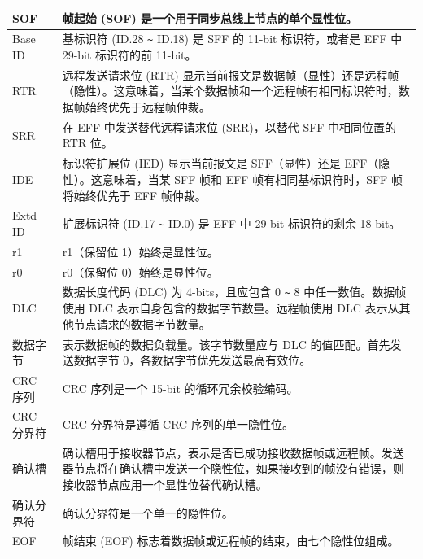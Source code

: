 \begin{longtable}[c]{|p{3.5cm}|p{12cm}|}
    SOF & 帧起始 (SOF) 是一个用于同步总线上节点的单个显性位。
          \\\hline
    Base ID & 基标识符 (ID.28 \verb+~+ ID.18) 是 SFF 的 11-bit 标识符，或者是 EFF 中 29-bit 标识符的前 11-bit。
          \\\hline
    RTR & 远程发送请求位 (RTR) 显示当前报文是数据帧（显性）还是远程帧（隐性）。这意味着，当某个数据帧和一个远程帧有相同标识符时，数据帧始终优先于远程帧仲裁。                                                    \\\hline
    SRR & 在 EFF 中发送替代远程请求位 (SRR)，以替代 SFF 中相同位置的 RTR 位。                       
           \\\hline
    IDE & 标识符扩展位 (IED) 显示当前报文是 SFF（显性）还是 EFF（隐性）。这意味着，当某 SFF 帧和 EFF 帧有相同基标识符时，SFF 帧将始终优先于 EFF 帧仲裁。              \\\hline
    Extd ID & 扩展标识符 (ID.17 \verb+~+ ID.0) 是 EFF 中 29-bit 标识符的剩余 18-bit。                                     \\\hline
    r1 & r1（保留位 1）始终是显性位。
             \\\hline 
    r0 & r0（保留位 0）始终是显性位。
             \\\hline
    DLC & 数据长度代码 (DLC) 为 4-bits，且应包含 0 \verb+~+ 8 中任一数值。数据帧使用 DLC 表示自身包含的数据字节数量。远程帧使用 DLC 表示从其他节点请求的数据字节数量。 
             \\\hline
    数据字节 & 表示数据帧的数据负载量。该字节数量应与 DLC 的值匹配。首先发送数据字节 0，各数据字节优先发送最高有效位。
             \\\hline
    CRC 序列 & CRC 序列是一个 15-bit 的循环冗余校验编码。
             \\\hline
    CRC 分界符 & CRC 分界符是遵循 CRC 序列的单一隐性位。
              \\\hline
    确认槽 & 确认槽用于接收器节点，表示是否已成功接收数据帧或远程帧。发送器节点将在确认槽中发送一个隐性位，如果接收到的帧没有错误，则接收器节点应用一个显性位替代确认槽。
              \\\hline
    确认分界符 & 确认分界符是一个单一的隐性位。
              \\\hline
    EOF & 帧结束 (EOF) 标志着数据帧或远程帧的结束，由七个隐性位组成。
              \\\hline
\end{longtable}